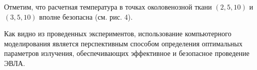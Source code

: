 Отметим, что расчетная температура в точках околовенозной ткани
$(2,5,10)$ и $(3,5,10)$ вполне безопасна (см. рис. 4).

Как видно из проведенных экспериментов, использование компьютерного моделирования
является перспективным способом определения оптимальных параметров излучения,
обеспечивающих эффективное и безопасное проведение ЭВЛА.

